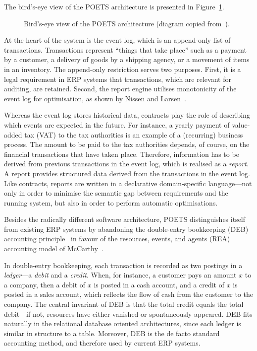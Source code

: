 The bird's-eye view of the POETS architecture is presented in
Figure~\ref{fig:origArch}.
\begin{figure}[t]
  \centering\small
  
  \caption{Bird's-eye view of the POETS
    architecture (diagram copied from~\cite{henglein09jlap}).}
  \label{fig:origArch}
\end{figure}
At the heart of the system is the event log, which is an append-only
list of transactions. Transactions represent ``things that take
place'' such as a payment by a customer, a delivery of goods by a
shipping agency, or a movement of items in an inventory. The
append-only restriction serves two purposes. First, it is a legal
requirement in ERP systems that transactions, which are relevant for
auditing, are retained. Second, the report engine utilises
monotonicity of the event log for optimisation, as shown by Nissen and
Larsen~\cite{nissen07ifl}.

Whereas the event log stores historical data, contracts play the role
of describing which events are expected in the future. For instance, a
yearly payment of value-added tax (VAT) to the tax authorities is an
example of a (recurring) business process. The amount to be paid to
the tax authorities depends, of course, on the financial transactions
that have taken place. Therefore, information has to be derived from
previous transactions in the event log, which is realised as a
\emph{report}. A report provides structured data derived from the
transactions in the event log. Like contracts, reports are written in
a declarative domain-specific language---not only in order to minimise
the semantic gap between requirements and the running system, but also
in order to perform automatic optimisations.

Besides the radically different software architecture, POETS
distinguishes itself from existing ERP systems by abandoning
the double-entry bookkeeping (DEB) accounting
principle~\cite{weygandt04book} in favour of the resources, events,
and agents (REA) accounting model of McCarthy~\cite{mccarthy82tar}.

In double-entry bookkeeping, each transaction is recorded as two
postings in a \emph{ledger}---a \emph{debit} and a
\emph{credit}. When, for instance, a customer pays an amount $x$ to
a company, then a debit of $x$ is posted in a cash account, and a
credit of $x$ is posted in a sales account, which reflects the flow of
cash from the customer to the company. The central invariant of DEB
is that the total credit equals the total debit---if not,
resources have either vanished or spontaneously appeared. DEB fits
naturally in the relational database oriented architectures, since
each ledger is similar in structure to a table. Moreover, DEB is the
de facto standard accounting method, and therefore used by
current ERP systems.

